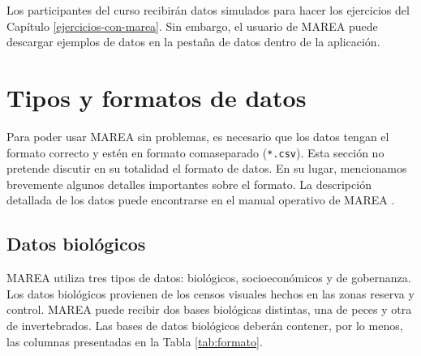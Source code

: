 \documentclass[]{krantz}
\begin{document}
Los participantes del curso recibirán datos simulados para hacer los
ejercicios del Capítulo \ref{ejercicios-con-marea}. Sin embargo, el
usuario de MAREA puede descargar ejemplos de datos en la pestaña de
datos dentro de la aplicación.

\hypertarget{tipos-y-formatos-de-datos}{%
\section{Tipos y formatos de datos}\label{tipos-y-formatos-de-datos}}

Para poder usar MAREA sin problemas, es necesario que los datos tengan
el formato correcto y estén en formato comaseparado (\texttt{*.csv}).
Esta sección no pretende discutir en su totalidad el formato de datos.
En su lugar, mencionamos brevemente algunos detalles importantes sobre
el formato. La descripción detallada de los datos puede encontrarse en
el manual operativo de MAREA \citep{villaseorderbez_2017}.

\hypertarget{datos-biologicos}{%
\subsection{Datos biológicos}\label{datos-biologicos}}

MAREA utiliza tres tipos de datos: biológicos, socioeconómicos y de
gobernanza. Los datos biológicos provienen de los censos visuales hechos
en las zonas reserva y control. MAREA puede recibir dos bases biológicas
distintas, una de peces y otra de invertebrados. Las bases de datos
biológicos deberán contener, por lo menos, las columnas presentadas en
la Tabla \ref{tab:formato}.
\end{document}
